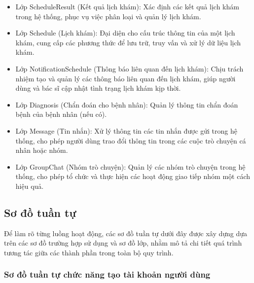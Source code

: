 \begin{itemize}
	\item Lớp ScheduleResult (Kết quả lịch khám): Xác định các kết quả lịch khám trong hệ thống, phục vụ việc phân loại và quản lý lịch khám.
	\item Lớp Schedule (Lịch khám): Đại diện cho cấu trúc thông tin của một lịch khám, cung cấp các phương thức để lưu trữ, truy vấn và xử lý dữ liệu lịch khám.
	\item Lớp NotificationSchedule (Thông báo liên quan đến lịch khám): Chịu trách nhiệm tạo và quản lý các thông báo liên quan đến lịch khám, giúp người dùng và bác sĩ cập nhật tình trạng lịch khám kịp thời.
	\item Lớp Diagnosis (Chẩn đoán cho bệnh nhân): Quản lý thông tin chẩn đoán bệnh của bệnh nhân (nếu có).
	\item Lớp Message (Tin nhắn): Xử lý thông tin các tin nhắn được gửi trong hệ thống, cho phép người dùng trao đổi thông tin trong các cuộc trò chuyện cá nhân hoặc nhóm.
	\item Lớp GroupChat (Nhóm trò chuyện): Quản lý các nhóm trò chuyện trong hệ thống, cho phép tổ chức và thực hiện các hoạt động giao tiếp nhóm một cách hiệu quả.
\end{itemize}
\subsection{Sơ đồ tuần tự}
Để làm rõ từng luồng hoạt động, các sơ đồ tuần tự dưới đây được xây dựng dựa trên các sơ đồ trường hợp sử dụng và sơ đồ lớp, nhằm mô tả chi tiết quá trình tương tác giữa các thành phần trong toàn bộ quy trình.

\subsubsection{Sơ đồ tuần tự chức năng tạo tài khoản người dùng}

